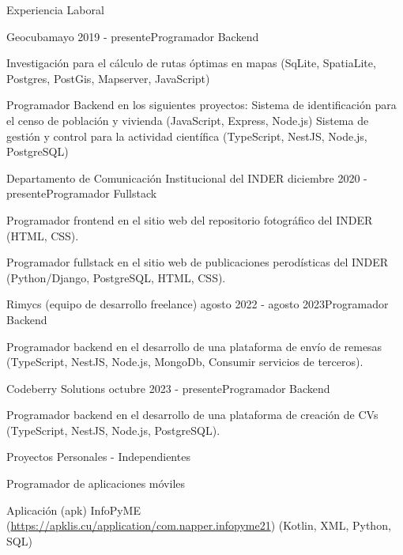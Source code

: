 \documentclass{resume}
\begin{document}
	
	\begin{rSection}{Experiencia Laboral}
		\begin{rSubsection}{Geocuba}{mayo 2019 - presente}{Programador Backend}{}
			\item Investigación para el cálculo de rutas óptimas en mapas
				\subitem (SqLite, SpatiaLite, Postgres, PostGis, Mapserver, JavaScript)
			\item Programador Backend en los siguientes proyectos: 
				\subitem Sistema de identificación para el censo de población y vivienda 
					\subsubitem (JavaScript, Express, Node.js)
				\subitem Sistema de gestión y control para la actividad científica
					\subsubitem(TypeScript, NestJS, Node.js, PostgreSQL)
		\end{rSubsection}
	
		\begin{rSubsection}{Departamento de Comunicación Institucional del INDER}{ diciembre 2020 - presente}{Programador Fullstack}{}
			\item Programador frontend en el sitio web del repositorio fotográfico del INDER 
				\subitem(HTML, CSS).
			\newline
			\item Programador fullstack en el sitio web de publicaciones perodísticas del INDER 
				\subitem(Python/Django, PostgreSQL, HTML, CSS).
			
		\end{rSubsection}
		
		\begin{rSubsection}{Rimycs (equipo de desarrollo freelance)}{ agosto 2022 - agosto 2023}{Programador Backend}{}
			\item Programador backend en el desarrollo de una plataforma de envío de remesas 
			\subitem(TypeScript, NestJS, Node.js, MongoDb, Consumir servicios de terceros).
			
		\end{rSubsection}	
	
		\begin{rSubsection}{Codeberry Solutions}{ octubre 2023 - presente}{Programador Backend}{}
			\item Programador backend en el desarrollo de una plataforma de creación de CVs 
			\subitem(TypeScript, NestJS, Node.js, PostgreSQL).
			
		\end{rSubsection}	
		
	\end{rSection}

	\begin{rSection}{Proyectos Personales - Independientes}
		\begin{rSubsection}{Programador de aplicaciones móviles}{}{}
			\item  Aplicación (apk) InfoPyME
			(\href{https://apklis.cu/application/com.napper.infopyme21}{https://apklis.cu/application/com.napper.infopyme21})
				\subitem (Kotlin, XML, Python, SQL)
		\end{rSubsection}	
	\end{rSection}
	
\end{document}

